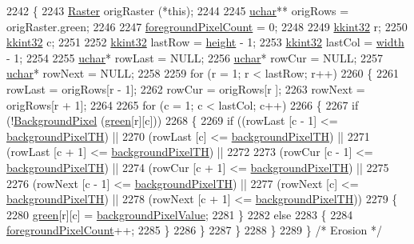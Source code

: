 \begin{DoxyCode}
2242 \{
2243   \hyperlink{class_k_k_b_1_1_raster}{Raster}  origRaster (*\textcolor{keyword}{this});
2244 
2245   \hyperlink{namespace_k_k_b_ace9969169bf514f9ee6185186949cdf7}{uchar}**  origRows = origRaster.green;
2246 
2247   \hyperlink{class_k_k_b_1_1_raster_aa7e86253f4b9c347da718732e44b60e8}{foregroundPixelCount} = 0;
2248 
2249   \hyperlink{namespace_k_k_b_a8fa4952cc84fda1de4bec1fbdd8d5b1b}{kkint32}  r;
2250   \hyperlink{namespace_k_k_b_a8fa4952cc84fda1de4bec1fbdd8d5b1b}{kkint32}  c;
2251 
2252   \hyperlink{namespace_k_k_b_a8fa4952cc84fda1de4bec1fbdd8d5b1b}{kkint32}  lastRow = \hyperlink{class_k_k_b_1_1_raster_af39ff189de4fbb6de98392e187efafb7}{height} - 1;
2253   \hyperlink{namespace_k_k_b_a8fa4952cc84fda1de4bec1fbdd8d5b1b}{kkint32}  lastCol = \hyperlink{class_k_k_b_1_1_raster_ae0bcc103e191c3421d7692dc69ceb554}{width} - 1;
2254 
2255   \hyperlink{namespace_k_k_b_ace9969169bf514f9ee6185186949cdf7}{uchar}*  rowLast = NULL;
2256   \hyperlink{namespace_k_k_b_ace9969169bf514f9ee6185186949cdf7}{uchar}*  rowCur  = NULL;
2257   \hyperlink{namespace_k_k_b_ace9969169bf514f9ee6185186949cdf7}{uchar}*  rowNext = NULL;
2258 
2259   \textcolor{keywordflow}{for}  (r = 1; r < lastRow; r++)
2260   \{
2261     rowLast = origRows[r - 1];
2262     rowCur  = origRows[r    ];
2263     rowNext = origRows[r + 1];
2264 
2265     \textcolor{keywordflow}{for}  (c = 1; c < lastCol; c++)
2266     \{
2267       \textcolor{keywordflow}{if}  (!\hyperlink{class_k_k_b_1_1_raster_a0756fb5530274d5e28858d3e1633d595}{BackgroundPixel} (\hyperlink{class_k_k_b_1_1_raster_a2d2238911145488e226cd2e34fc8448c}{green}[r][c]))
2268       \{
2269         \textcolor{keywordflow}{if}  ((rowLast [c - 1] <= \hyperlink{class_k_k_b_1_1_raster_a3c4e96eaf48274f5d8912617f81f2a0b}{backgroundPixelTH})  ||
2270              (rowLast [c]     <= \hyperlink{class_k_k_b_1_1_raster_a3c4e96eaf48274f5d8912617f81f2a0b}{backgroundPixelTH})  ||
2271              (rowLast [c + 1] <= \hyperlink{class_k_k_b_1_1_raster_a3c4e96eaf48274f5d8912617f81f2a0b}{backgroundPixelTH})  ||
2272 
2273              (rowCur  [c - 1] <= \hyperlink{class_k_k_b_1_1_raster_a3c4e96eaf48274f5d8912617f81f2a0b}{backgroundPixelTH})  ||
2274              (rowCur  [c + 1] <= \hyperlink{class_k_k_b_1_1_raster_a3c4e96eaf48274f5d8912617f81f2a0b}{backgroundPixelTH})  ||
2275 
2276              (rowNext [c - 1] <= \hyperlink{class_k_k_b_1_1_raster_a3c4e96eaf48274f5d8912617f81f2a0b}{backgroundPixelTH})  ||
2277              (rowNext [c]     <= \hyperlink{class_k_k_b_1_1_raster_a3c4e96eaf48274f5d8912617f81f2a0b}{backgroundPixelTH})  ||
2278              (rowNext [c + 1] <= \hyperlink{class_k_k_b_1_1_raster_a3c4e96eaf48274f5d8912617f81f2a0b}{backgroundPixelTH}))
2279         \{
2280           \hyperlink{class_k_k_b_1_1_raster_a2d2238911145488e226cd2e34fc8448c}{green}[r][c] = \hyperlink{class_k_k_b_1_1_raster_ab7ed2191cce116a6a37029dc6e3713ef}{backgroundPixelValue};
2281         \}
2282         \textcolor{keywordflow}{else}
2283         \{
2284           \hyperlink{class_k_k_b_1_1_raster_aa7e86253f4b9c347da718732e44b60e8}{foregroundPixelCount}++;
2285         \}
2286       \}
2287     \}
2288   \}
2289 \}  \textcolor{comment}{/* Erosion */}
\end{DoxyCode}
